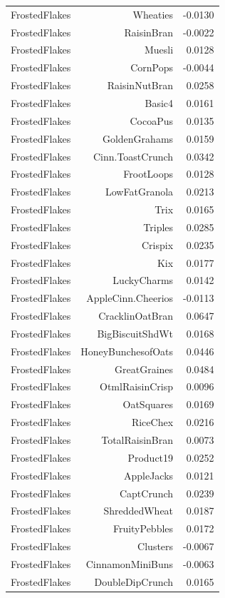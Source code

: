 \begin{longtable}{@{}lrr@{}}
FrostedFlakes & Wheaties & -0.0130 \\
FrostedFlakes & RaisinBran & -0.0022 \\
FrostedFlakes & Muesli & 0.0128 \\
FrostedFlakes & CornPops & -0.0044 \\
FrostedFlakes & RaisinNutBran & 0.0258 \\
FrostedFlakes & Basic4 & 0.0161 \\
FrostedFlakes & CocoaPus & 0.0135 \\
FrostedFlakes & GoldenGrahams & 0.0159 \\
FrostedFlakes & Cinn.ToastCrunch & 0.0342 \\
FrostedFlakes & FrootLoops & 0.0128 \\
FrostedFlakes & LowFatGranola & 0.0213 \\
FrostedFlakes & Trix & 0.0165 \\
FrostedFlakes & Triples & 0.0285 \\
FrostedFlakes & Crispix & 0.0235 \\
FrostedFlakes & Kix & 0.0177 \\
FrostedFlakes & LuckyCharms & 0.0142 \\
FrostedFlakes & AppleCinn.Cheerios & -0.0113 \\
FrostedFlakes & CracklinOatBran & 0.0647 \\
FrostedFlakes & BigBiscuitShdWt & 0.0168 \\
FrostedFlakes & HoneyBunchesofOats & 0.0446 \\
FrostedFlakes & GreatGraines & 0.0484 \\
FrostedFlakes & OtmlRaisinCrisp & 0.0096 \\
FrostedFlakes & OatSquares & 0.0169 \\
FrostedFlakes & RiceChex & 0.0216 \\
FrostedFlakes & TotalRaisinBran & 0.0073 \\
FrostedFlakes & Product19 & 0.0252 \\
FrostedFlakes & AppleJacks & 0.0121 \\
FrostedFlakes & CaptCrunch & 0.0239 \\
FrostedFlakes & ShreddedWheat & 0.0187 \\
FrostedFlakes & FruityPebbles & 0.0172 \\
FrostedFlakes & Clusters & -0.0067 \\
FrostedFlakes & CinnamonMiniBuns & -0.0063 \\
FrostedFlakes & DoubleDipCrunch & 0.0165 \\

\end{longtable}
